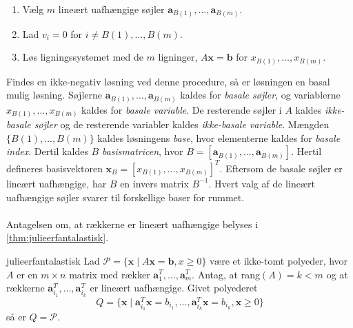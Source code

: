 %
\begin{enumerate}
\item Vælg $m$ lineært uafhængige søjler $\textbf{a}_{B(1)},\ldots,\textbf{a}_{B(m)}.$
\item Lad $v_i=0$ for $i \neq B(1),\ldots,B(m).$
\item Løs ligningssystemet med de $m$ ligninger, $A\textbf{x}=\textbf{b}$ for $x_{B(1)}, \ldots , x_{B(m)}.$
\end{enumerate}
%
Findes en ikke-negativ løsning ved denne procedure, så er løsningen en basal mulig løsning.
Søjlerne $\textbf{a}_{B(1)},\ldots,\textbf{a}_{B(m)}$ kaldes for \textit{basale søjler}, og variablerne $x_{B(1)},\ldots,x_{B(m)}$ kaldes for \textit{basale variable}. De resterende søjler i $A$ kaldes \textit{ikke-basale søjler} og de resterende variabler kaldes \textit{ikke-basale variable}. 
Mængden $\{ B(1),\ldots,B(m) \}$ kaldes løsningens \textit{base}, hvor elementerne kaldes for \textit{basale index}. 
Dertil kaldes $B$ \textit{basismatricen}, hvor $B= [ \textbf{a}_{B(1)},\ldots,\textbf{a}_{B(m)} ] $.
Hertil defineres basisvektoren $\mathbf{x}_B = [ x_{B(1)},\ldots,x_{B(m)}]^T.$
Eftersom de basale søjler er lineært uafhængige, har $B$ en invers matrix $B^{-1}$.
Hvert valg af de lineært uafhængige søjler svarer til forskellige baser for rummet.
\\\\
%
Antagelsen om, at rækkerne er lineært uafhængige belyses i \ref{thm:julieerfantalastisk}.
%
\begin{thm}{}{julieerfantalastisk}
Lad $\mathcal{P}=\{\textbf{x} \mid  A\textbf{x}=\textbf{b},x \geq 0\}$ være et ikke-tomt polyeder, hvor $A$ er en $m \times n$ matrix med rækker $\textbf{a}^{T}_{1},\ldots,\textbf{a}^{T}_{m}$.
Antag, at rang$(A)=k<m$ og at rækkerne $\textbf{a}^T_{i_1},\ldots,\textbf{a}^T_{i_k}$ er lineært uafhængige. Givet polyederet 
$$Q=\{\textbf{x} \mid \textbf{a}^T_{i_1}\textbf{x}=b_{i_1},\ldots,\textbf{a}^T_{i_k}\textbf{x}=b_{i_k}, \textbf{x} \geq 0  \}$$ 
så er $Q=\mathcal{P}$.
\end{thm}
